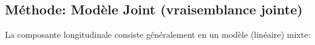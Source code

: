 \documentclass[10pt,a0,portrait]{a0poster}
\begin{document}
\color{DarkSlateGray}
\begin{multicols}{2}
\section*{Méthode: \large{Modèle Joint (vraisemblance jointe)}}
\vspace{-1cm}
\begin{center}
    \label{Fig1}
\end{center}
\par{La composante longitudinale consiste généralement en un modèle (linéaire) mixte:}


\end{multicols}
\end{document}
